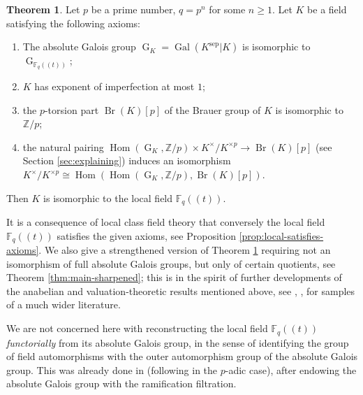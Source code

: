 \documentclass[a4paper, british, oneside]{amsart}
\newcommand{\Z}{\mathbb{Z}}
\newcommand{\F}{\mathbb{F}}
\DeclareMathOperator{\G}{G}
\DeclareMathOperator{\Gal}{Gal}
\DeclareMathOperator{\Br}{Br}
\DeclareMathOperator{\Hom}{Hom}
\newcommand{\pow}[1]{(\!(#1)\!)}
\theoremstyle{definition}
\newtheorem{theorem}{Theorem}[section]
\theoremstyle{remark}
\begin{document}
\begin{theorem}\label{thm:intro-basic}
  Let $p$ be a prime number, $q = p^n$ for some $n \geq 1$.
  Let $K$ be a field satisfying the following axioms:
  \begin{enumerate}
  \item[(Gal)] The absolute Galois group $\G_K = \Gal(K^{\mathrm{sep}}|K)$ is isomorphic to $\G_{\F_q\pow{t}}$;
    \item[(Imp)] $K$ has exponent of imperfection at most $1$;
    \item[(Brau)] the $p$-torsion part $\Br(K)[p]$ of the Brauer group of $K$ is isomorphic to $\Z/p$;
    \item[(Pair)] the natural pairing $\Hom(\G_K, \Z/p) \times K^\times/K^{\times p} \to \Br(K)[p]$ (see Section \ref{sec:explaining}) induces an isomorphism $K^\times/K^{\times p} \cong \Hom(\Hom(\G_K, \Z/p), \Br(K)[p])$.
  \end{enumerate}
  Then $K$ is isomorphic to the local field $\F_q\pow{t}$.
\end{theorem}
It is a consequence of local class field theory that conversely the local field $\F_q\pow{t}$ satisfies the given axioms, see Proposition \ref{prop:local-satisfies-axioms}.
We also give a strengthened version of Theorem \ref{thm:intro-basic} requiring not an isomorphism of full absolute Galois groups, but only of certain quotients, see Theorem \ref{thm:main-sharpened};
this is in the spirit of further developments of the anabelian and
valuation-theoretic results mentioned above, see
\cite{Pop_modpMetabelianBirationalSectionConjecture},
\cite{Topaz_CommutingLiftableII},
\cite{EfratMinac_SmallGaloisEncodeValuations}
for samples of a much wider literature.

We are not concerned here with reconstructing the local field $\F_q\pow{t}$ \emph{functorially} from its absolute Galois group,
in the sense of identifying the group of field automorphisms with the outer automorphism group of the absolute Galois group.
This was already done in \cite{Abrashkin_ModifiedLocalAnalogueGrothendieck}
(following \cite{Mochizuki_VersionGrothendieckPAdic} in the $p$-adic case),
after endowing the absolute Galois group with the ramification filtration.
\end{document}
